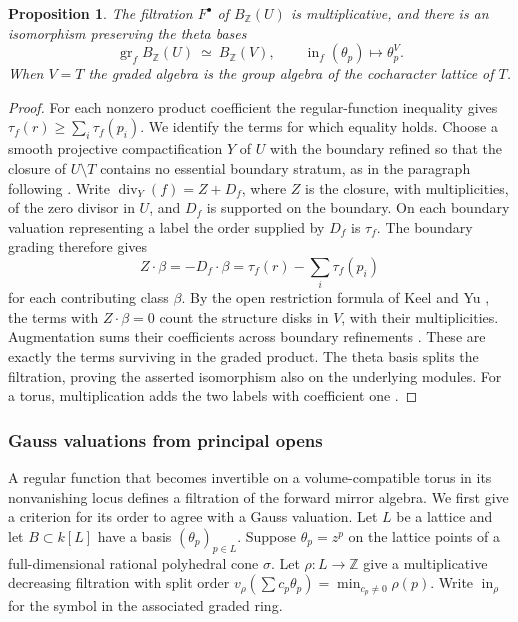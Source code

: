 \documentclass[11pt,reqno]{amsart}
\numberwithin{equation}{section}
\newtheorem{proposition}[theorem]{Proposition}
\theoremstyle{definition}
\theoremstyle{remark}
\begin{document}
\begin{proposition}\label{prop:principal-open}
The filtration \(F^\bullet\) of \(B_{\mathbb Z}(U)\) is multiplicative, and
there is an isomorphism preserving the theta bases
\[ \operatorname{gr}_f B_{\mathbb Z}(U)\ \simeq\ B_{\mathbb Z}(V),\qquad \operatorname{in}_f(\theta_p)\longmapsto\theta_p^V . \]
When \(V=T\) the graded algebra is the group algebra of the
cocharacter lattice of \(T\).
\end{proposition}
\begin{proof}
For each nonzero product coefficient the regular-function inequality
gives \(\tau_f(r)\ge\sum_i\tau_f(p_i)\). We identify the terms for which
equality holds. Choose a smooth projective compactification \(Y\) of
\(U\) with the boundary refined so that
the closure of \(U\setminus T\) contains no essential boundary stratum,
as in the paragraph following \cite[Lemma~18.3]{KY}. Write
\(\operatorname{div}_Y(f)=Z+D_f\), where \(Z\) is the closure, with
multiplicities, of the zero divisor in \(U\), and \(D_f\) is supported
on the boundary. On each boundary valuation representing a label the
order supplied by \(D_f\) is \(\tau_f\). The boundary grading therefore
gives
\[ Z\cdot\beta=-D_f\cdot\beta =\tau_f(r)-\sum_i\tau_f(p_i) \]
for each contributing class \(\beta\).
By the open restriction formula of Keel and Yu
\cite[Proposition~18.1(1),(4)]{KY}, the terms with \(Z\cdot\beta=0\)
count the structure disks in \(V\), with their multiplicities.
Augmentation sums their coefficients across boundary refinements
\cite[Proposition~17.3(1) and Remark~17.8]{KY}.
These are exactly the terms surviving in the graded product. The theta
basis splits the filtration, proving the asserted isomorphism also on
the underlying modules. For a torus, multiplication adds the two
labels with coefficient one \cite[Lemma~9.4 and \S18]{KY}.
\end{proof}

\subsubsection{Gauss valuations from principal opens}
\label{subsec:source-probe}

A regular function that becomes invertible on a volume-compatible
torus in its nonvanishing locus defines a filtration of the forward
mirror algebra. We first give a criterion for its order to agree
with a Gauss valuation. Let \(L\) be a lattice and let \(B\subset k[L]\) have a
basis \((\theta_p)_{p\in L}\). Suppose \(\theta_p=z^p\) on the lattice
points of a full-dimensional rational polyhedral cone \(\sigma\).
Let \(\rho:L\to\mathbb Z\) give a multiplicative decreasing filtration
with split order \(v_\rho(\sum c_p\theta_p)=\min_{c_p\ne0}\rho(p)\).
Write \(\operatorname{in}_\rho\) for the symbol in the associated
graded ring.
\end{document}
